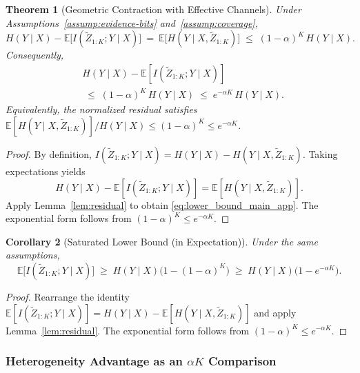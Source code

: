 \documentclass{article}
\theoremstyle{plain}
\newtheorem{theorem}{Theorem}[section]
\newtheorem{corollary}[theorem]{Corollary}
\theoremstyle{definition}
\theoremstyle{remark}
\newcommand{\EE}{\mathbb{E}}
\begin{document}
\begin{theorem}[Geometric Contraction with Effective Channels]
\label{thm:lb_saturated}
Under Assumptions~\ref{assump:evidence-bits} and~\ref{assump:coverage},
\begin{equation}
H(Y\mid X) - \EE\big[I(\tilde Z_{1:K};Y\mid X)\big]
~=~
\EE\big[H(Y\mid X,\tilde Z_{1:K})\big]
\;\le\;
(1-\alpha)^K\,H(Y\mid X).
\label{eq:lower_bound_main_app}
\end{equation}
Consequently,
\begin{equation}
\boxed{
\begin{split}
&H(Y\mid X) - \EE\!\left[I(\tilde Z_{1:K};Y\mid X)\right] \\
&\;\le\; (1-\alpha)^K \, H(Y\mid X)
\;\le\; e^{-\alpha K} \, H(Y\mid X).
\end{split}
}
\label{eq:lower_bound_main}
\end{equation}
Equivalently, the \emph{normalized residual} satisfies
$\EE[H(Y\mid X,\tilde Z_{1:K})]/H(Y\mid X)\le (1-\alpha)^K \le e^{-\alpha K}$.
\end{theorem}

\begin{proof}
By definition,
$I(\tilde Z_{1:K};Y\mid X)=H(Y\mid X)-H(Y\mid X,\tilde Z_{1:K})$.
Taking expectations yields
\begin{equation}
H(Y\mid X) - \EE[I(\tilde Z_{1:K};Y\mid X)]
=
\EE[H(Y\mid X,\tilde Z_{1:K})].
\end{equation}
Apply Lemma~\ref{lem:residual} to obtain \eqref{eq:lower_bound_main_app}.
The exponential form follows from $(1-\alpha)^K\le e^{-\alpha K}$.
\end{proof}

\begin{corollary}[Saturated Lower Bound (in Expectation)]
\label{cor:lb}
Under the same assumptions,
\begin{equation}
\boxed{
\EE\big[I(\tilde Z_{1:K};Y\mid X)\big]
\;\ge\;
H(Y\mid X)\Big(1-(1-\alpha)^K\Big)
\;\ge\;
H(Y\mid X)\Big(1-e^{-\alpha K}\Big).
}
\label{eq:lowerbound-exp}
\end{equation}
\end{corollary}

\begin{proof}
Rearrange the identity
$\EE[I(\tilde Z_{1:K};Y\mid X)]
=
H(Y\mid X)-\EE[H(Y\mid X,\tilde Z_{1:K})]$
and apply Lemma~\ref{lem:residual}. The exponential form follows from
$(1-\alpha)^K\le e^{-\alpha K}$.
\end{proof}

\subsubsection{Heterogeneity Advantage as an $\alpha K$ Comparison}
\label{app:heterog_homog_gap}
\end{document}
